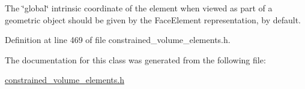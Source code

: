 The \char`\"{}global\char`\"{} intrinsic coordinate of the element when viewed as part of a geometric object should be given by the Face\+Element representation, by default. 



Definition at line 469 of file constrained\+\_\+volume\+\_\+elements.\+h.



The documentation for this class was generated from the following file\+:\begin{DoxyCompactItemize}
\item 
\hyperlink{constrained__volume__elements_8h}{constrained\+\_\+volume\+\_\+elements.\+h}\end{DoxyCompactItemize}
